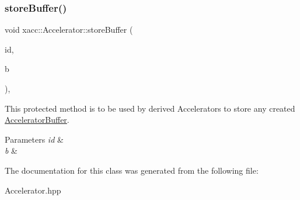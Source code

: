 \subsubsection{\texorpdfstring{store\+Buffer()}{storeBuffer()}}
{\footnotesize\ttfamily void xacc\+::\+Accelerator\+::store\+Buffer (\begin{DoxyParamCaption}\item[{const std\+::string \&}]{id,  }\item[{std\+::shared\+\_\+ptr$<$ \hyperlink{a02444}{Accelerator\+Buffer} $>$}]{b }\end{DoxyParamCaption})\hspace{0.3cm}{\ttfamily [inline]}, {\ttfamily [protected]}}

This protected method is to be used by derived Accelerators to store any created \hyperlink{a02444}{Accelerator\+Buffer}.


\begin{DoxyParams}{Parameters}
{\em id} & \\
\hline
{\em b} & \\
\hline
\end{DoxyParams}


The documentation for this class was generated from the following file\+:\begin{DoxyCompactItemize}
\item 
Accelerator.\+hpp\end{DoxyCompactItemize}
